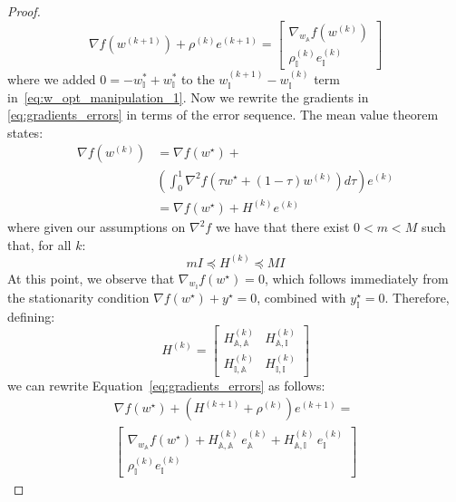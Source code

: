 \documentclass[10pt,a4paper]{amsart}
\begin{document}
\begin{proof}
\begin{equation}
\nabla f(w^{(k+1)}) + \rho^{(k)} e^{(k+1)} = \begin{bmatrix}
    \nabla_{w_{\mathbb{A}}}f(w^{(k)}) \\
    \rho_{\mathbb{I}}^{(k)} e^{(k)}_{\mathbb{I}}
\end{bmatrix}
\end{equation}
where we added $0 = -w_\mathbb{I}^{*} + w_\mathbb{I}^{*}$ to the $w_\mathbb{I}^{(k+1)} - w_\mathbb{I}^{(k)}$ term in~\eqref{eq:w_opt_manipulation_1}.
Now we rewrite the gradients in \eqref{eq:gradients_errors} in terms of the error sequence. The mean value theorem states:
\begin{equation}
\begin{aligned}
    \nabla f(w^{(k)}) &= \nabla f(w^{\star}) + \\
    &\left( \int_0^1 \nabla^2 f(\tau w^{\star} + (1 - \tau) w^{(k)}) d\tau \right) e^{(k)} \\
    &= \nabla f(w^{\star}) +  H^{(k)} e^{(k)}
\end{aligned}
\end{equation}
where given our assumptions on $\nabla^2f$ we have that there exist $0 < m < M$ such that, for all $k$:
\begin{equation}
\label{eq:H_bounds}
mI \preceq H^{(k)} \preceq M I
\end{equation}
At this point, we observe that $\nabla_{w_\mathbb{I}}f(w^{\star}) = 0$, which follows immediately from the stationarity condition $\nabla f(w^{\star}) + y^{\star} = 0$, combined with $y_\mathbb{I}^{\star} = 0$. Therefore, defining:
\begin{equation}
    H^{(k)} = \begin{bmatrix}
        H_{\mathbb{A}, \mathbb{A}}^{(k)} & H_{\mathbb{A},\mathbb{I}}^{(k)} \\
        H_{\mathbb{I}, \mathbb{A}}^{(k)} & H_{\mathbb{I}, \mathbb{I}}^{(k)}
    \end{bmatrix}
\end{equation}
we can rewrite Equation~\eqref{eq:gradients_errors} as follows:
\begin{equation}
\begin{aligned}
    \nabla f(w^{{\star}}) + (H^{(k+1)} + \rho^{(k)}) e^{(k+1)} = \\
    \begin{bmatrix} \nabla_{w_{\mathbb{A}}}f(w^{\star}) + 
    H^{(k)}_{\mathbb{A},\mathbb{A}}\, e_{\mathbb{A}}^{(k)} + H_{\mathbb{A}, \mathbb{I}}^{(k)} \,e_{\mathbb{I}}^{(k)} \\
    \rho_{\mathbb{I}}^{(k)} e_{\mathbb{I}}^{(k)}

\end{bmatrix}
\end{aligned}
\end{equation}
\end{proof}
\end{document}

